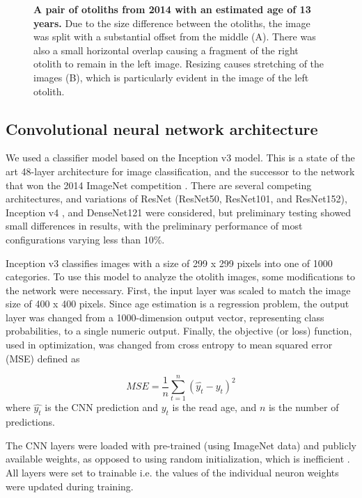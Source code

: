 \documentclass[10pt,letterpaper]{article}
\begin{document}
\begin{figure}[H]
\centering
\caption{\textbf{A pair of otoliths from 2014 with an estimated age of 13 years.} Due to the size difference between the otoliths, the image was split with a substantial offset from the middle (A).  There was also a small horizontal overlap causing a fragment of the right otolith to remain in the left image. Resizing causes stretching of the images (B), which is particularly evident in the image of the left otolith.}
  \label{fig:preprocess}
\end{figure}

\subsection*{Convolutional neural network architecture}

We used a classifier model based on the Inception v3 \citep{2015arXiv151200567S} model. This is a state of the art 48-layer architecture for image classification, and the successor to the network \citep{szegedy2015going} that won the 2014 ImageNet competition \citep{deng2009imagenet}.  There are several competing architectures, and variations of ResNet \citep{he2016deep} (ResNet50, ResNet101, and ResNet152), Inception v4 \citep{szegedy2017inception}, and DenseNet121 \citep{huang2017densely} were considered, but preliminary testing showed small differences in results, with the preliminary performance of most configurations varying less than 10\%.

Inception v3 classifies images with a size of 299 x 299 pixels into one of 1000 categories. To use this model to analyze the otolith images, some modifications to the network were necessary. First, the input layer was scaled to match the image size of 400 x 400 pixels. Since age estimation is a regression problem, the output layer was changed from a 1000-dimension output vector, representing class probabilities, to a single numeric output. Finally, the objective (or loss) function, used in optimization, was changed from cross entropy to mean squared error (MSE) defined as

\begin{equation}
\label{eq:MSE}
MSE=\frac{1}{n}\sum_{t=1}^{n} (\hat{y_t} - y_t)^2 \end{equation}
where $\hat{y_t}$ is the CNN prediction and $y_t$ is the read age, and $n$ is the number of predictions.

The CNN layers were loaded with pre-trained (using ImageNet data) and publicly available weights, as opposed to using random initialization, which is inefficient \citep{NIPS2014_5347}. All layers were set to trainable i.e. the values of the individual neuron weights were updated during training.
\end{document}
